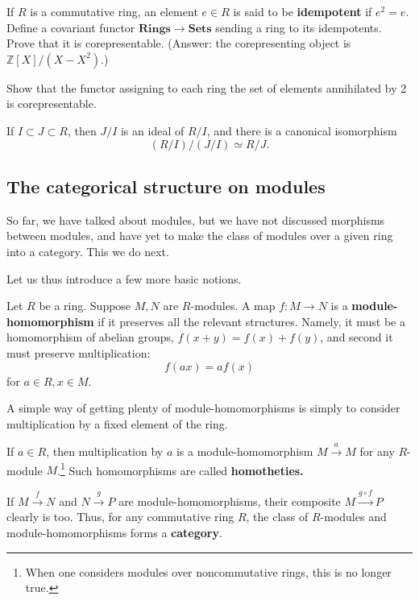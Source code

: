 \begin{exercise} 
 If $R$ is a commutative
ring, an element $e \in R$ is said to be \textbf{idempotent} if $e^2 =
e$. Define a covariant functor $\mathbf{Rings} \to \mathbf{Sets}$ sending a
ring to its idempotents. Prove that it is corepresentable. (Answer: the
corepresenting object is $\mathbb{Z}[X]/(X - X^2)$.)
\end{exercise} 

\begin{exercise} 
Show that the functor assigning to each ring the set of elements annihilated
by 2 is corepresentable. 
\end{exercise} 

\begin{exercise}
If $I \subset J \subset R$, then $J/I$ is an ideal of $R/I$, and there is a
canonical isomorphism
\[ (R/I)/(J/I) \simeq R/J.  \]
\end{exercise} 


\subsection{The categorical structure on modules}
So far, we have talked about modules, but we have not discussed morphisms
between modules, and have yet to make the class of modules over a given ring
into a category. This we do next.

Let us thus  introduce a  few more basic notions.

\begin{definition} 
Let $R$ be a ring.  Suppose $M,N$ are $R$-modules.  A map $f: M \to N$
is a \textbf{module-homomorphism} if it preserves all the relevant structures.
Namely, it must be a homomorphism of abelian groups, $f(x+y) = f(x) + f(y)$,
and second it must
preserve multiplication:
$$f(ax)  = af(x)$$ for $a \in R, x \in M$. 
\end{definition}

A simple way of getting plenty of module-homomorphisms is simply to consider
multiplication by a fixed element of the ring. 
\begin{example} 
If $a \in R$, then multiplication by $a$ is a module-homomorphism $M
\stackrel{a}{\to} M$ for any $R$-module $M$.\footnote{When one considers
modules over noncommutative rings, this is no longer true.} Such homomorphisms
are called \textbf{homotheties.}
\end{example} 


If $M \stackrel{f}{\to} N$ and $N \stackrel{g}{\to} P$ are
module-homomorphisms, their composite $M \stackrel{g \circ f}{\to} P$ clearly
is too. 
Thus, for any commutative ring $R$, the class of $R$-modules and
module-homomorphisms forms a \textbf{category}.

